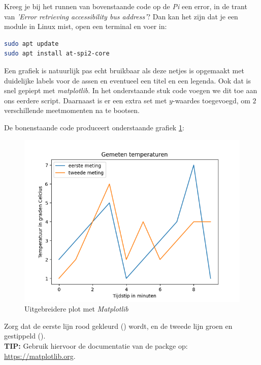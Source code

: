 \newpage

\begin{remark}
Kreeg je bij het runnen van bovenstaande code op de \textit{Pi} een error, in de trant van \textit{'Error retrieving accessibility bus address'}? Dan kan het zijn dat je een module in Linux mist, open een terminal en voer in: 
\begin{lstlisting}[language=bash]
sudo apt update
sudo apt install at-spi2-core
\end{lstlisting}
\end{remark}

Een grafiek is natuurlijk pas echt bruikbaar als deze netjes is opgemaakt met duidelijke labels voor de assen en eventueel een titel en een legenda. Ook dat is snel gepiept met \textit{matplotlib}. In het onderstaande stuk code voegen we dit toe aan ons eerdere script. Daarnaast is er een extra set met $y$-waardes toegevoegd, om $2$ verschillende meetmomenten na te bootsen.


De bonenstaande code produceert onderstaande grafiek \ref{fig:plot2}:
\begin{figure}[h!]
\centering\includegraphics[scale=0.7]{Pictures/chapter07/plot2.png}
\caption{Uitgebreidere plot met \textit{Matplotlib}}
\label{fig:plot2} 
\end{figure}

\begin{exercise}
Zorg dat de eerste lijn rood gekleurd () wordt, en de tweede lijn groen en gestippeld (). \\
\textbf{TIP: } Gebruik hiervoor de documentatie van de packge op: \url{https://matplotlib.org}. 
\end{exercise}


